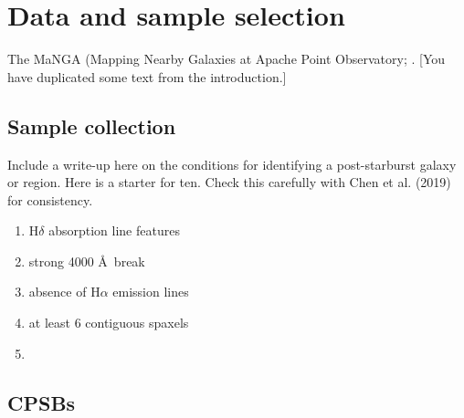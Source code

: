 \section{Data and sample selection}
\label{sec:sample}
The MaNGA (Mapping Nearby Galaxies at Apache Point Observatory; \citet{2015ApJ...798....7B}. [You have duplicated some text from the introduction.]
\subsection{Sample collection}
Include a write-up here on the conditions for identifying a post-starburst galaxy or region. Here is a starter for ten. Check this carefully with Chen et al. (2019) for consistency.
\begin{enumerate}
    \item H$\delta$ absorption line features
    \item strong 4000 \AA\ break 
    \item absence of H$\alpha$ emission lines
    \item at least 6 contiguous spaxels
    \item 
\end{enumerate}

\subsection{CPSBs}

